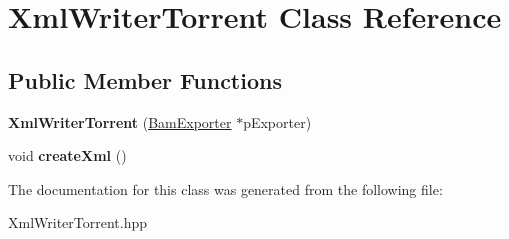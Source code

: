 \hypertarget{classXmlWriterTorrent}{\section{Xml\-Writer\-Torrent Class Reference}
\label{classXmlWriterTorrent}
}
\subsection*{Public Member Functions}
\begin{DoxyCompactItemize}
\item 
\hypertarget{classXmlWriterTorrent_ac8fed4a7428721d51929c2650a461104}{{\bfseries Xml\-Writer\-Torrent} (\hyperlink{classBamExporter}{Bam\-Exporter} $\ast$p\-Exporter)}\label{classXmlWriterTorrent_ac8fed4a7428721d51929c2650a461104}

\item 
\hypertarget{classXmlWriterTorrent_ac4ea95f4267f69164b3c0ca728f0b423}{void {\bfseries create\-Xml} ()}\label{classXmlWriterTorrent_ac4ea95f4267f69164b3c0ca728f0b423}

\end{DoxyCompactItemize}


The documentation for this class was generated from the following file\-:\begin{DoxyCompactItemize}
\item 
Xml\-Writer\-Torrent.\-hpp\end{DoxyCompactItemize}
